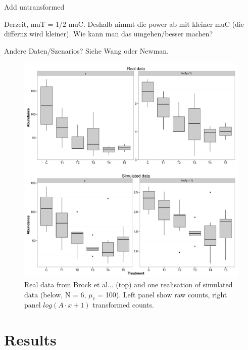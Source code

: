 \documentclass{scrartcl}\usepackage[]{graphicx}\usepackage[]{color}
\begin{document}
Add untransformed





Derzeit, muT = 1/2 muC. Deshalb nimmt die power ab mit kleiner muC (die differnz wird kleiner). Wie kann man das umgehen/besser machen?

Andere Daten/Szenarios? Siehe Wang oder Newman.

\begin{figure}
  \includegraphics[width = \textwidth]{p4_1.pdf}
  \caption{Real data from Brock et al... (top) and one realisation of simulated data (below, N = 6, $\mu_c$ = 100). Left panel show raw counts, right panel $log(A \cdot x + 1)$ transformed counts.}
  \label{fig:p4_1}
\end{figure}



\section{Results}
\end{document}
